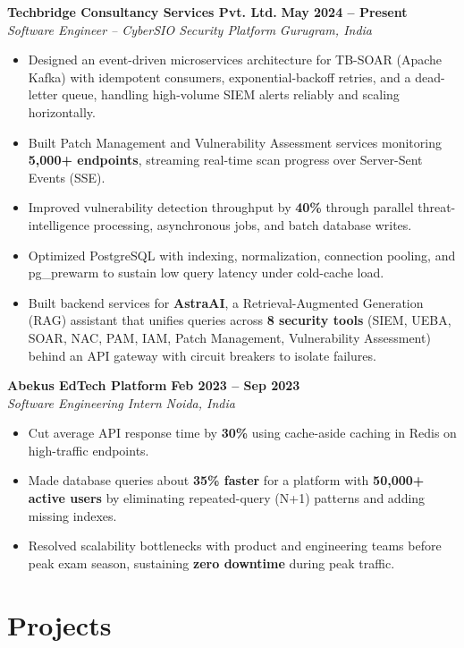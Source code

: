 \documentclass[10pt,letterpaper]{article}
\newcommand{\resumeSubheading}[4]{
    \textbf{#1} \hfill \textbf{#2}\\
    \textit{#3} \hfill \textit{#4}

}
\newcommand{\resumeItem}[1]{
    \item #1
}
\begin{document}
\resumeSubheading
    {Techbridge Consultancy Services Pvt. Ltd.}
    {May 2024 -- Present}
    {Software Engineer -- CyberSIO Security Platform}
    {Gurugram, India}

\begin{itemize}
    \resumeItem{Designed an event-driven microservices architecture for TB-SOAR (Apache Kafka) with idempotent consumers, exponential-backoff retries, and a dead-letter queue, handling high-volume SIEM alerts reliably and scaling horizontally.}

    \resumeItem{Built Patch Management and Vulnerability Assessment services monitoring \textbf{5,000+ endpoints}, streaming real-time scan progress over Server-Sent Events (SSE).}

    \resumeItem{Improved vulnerability detection throughput by \textbf{40\%} through parallel threat-intelligence processing, asynchronous jobs, and batch database writes.}

    \resumeItem{Optimized PostgreSQL with indexing, normalization, connection pooling, and pg\_prewarm to sustain low query latency under cold-cache load.}

    \resumeItem{Built backend services for \textbf{AstraAI}, a Retrieval-Augmented Generation (RAG) assistant that unifies queries across \textbf{8 security tools} (SIEM, UEBA, SOAR, NAC, PAM, IAM, Patch Management, Vulnerability Assessment) behind an API gateway with circuit breakers to isolate failures.}
\end{itemize}

\vspace{1pt}

\resumeSubheading
    {Abekus EdTech Platform}
    {Feb 2023 -- Sep 2023}
    {Software Engineering Intern}
    {Noida, India}

\begin{itemize}
    \resumeItem{Cut average API response time by \textbf{30\%} using cache-aside caching in Redis on high-traffic endpoints.}

    \resumeItem{Made database queries about \textbf{35\% faster} for a platform with \textbf{50,000+ active users} by eliminating repeated-query (N+1) patterns and adding missing indexes.}

    \resumeItem{Resolved scalability bottlenecks with product and engineering teams before peak exam season, sustaining \textbf{zero downtime} during peak traffic.}
\end{itemize}

\section{Projects}
\end{document}
